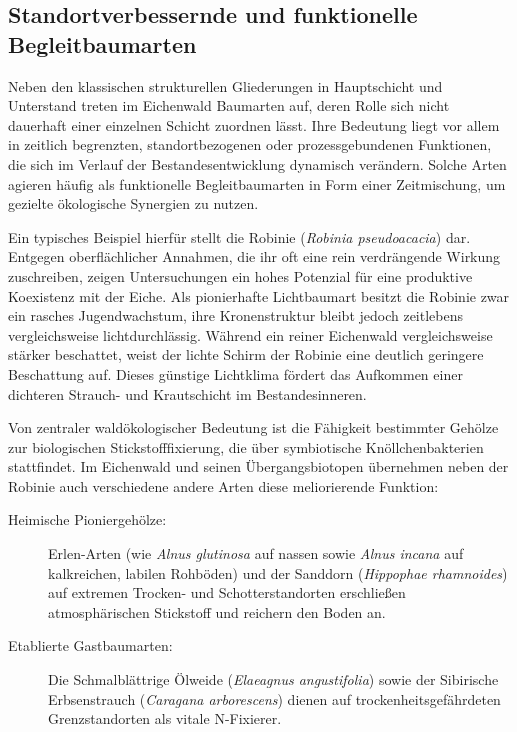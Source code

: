 \documentclass[twocolumn, bibliography=totoc, abstract=true]{scrartcl}
\begin{document}
\subsection{Standortverbessernde und funktionelle Begleitbaumarten}

Neben den klassischen strukturellen Gliederungen in Hauptschicht und Unterstand treten im Eichenwald Baumarten auf, deren Rolle sich nicht dauerhaft einer einzelnen Schicht zuordnen lässt. Ihre Bedeutung liegt vor allem in zeitlich begrenzten, standortbezogenen oder prozessgebundenen Funktionen, die sich im Verlauf der Bestandesentwicklung dynamisch verändern. Solche Arten agieren häufig als funktionelle Begleitbaumarten in Form einer Zeitmischung, um gezielte ökologische Synergien zu nutzen.

Ein typisches Beispiel hierfür stellt die Robinie (\textit{Robinia pseudoacacia}) dar. Entgegen oberflächlicher Annahmen, die ihr oft eine rein verdrängende Wirkung zuschreiben, zeigen Untersuchungen ein hohes Potenzial für eine produktive Koexistenz mit der Eiche. Als pionierhafte Lichtbaumart besitzt die Robinie zwar ein rasches Jugendwachstum, ihre Kronenstruktur bleibt jedoch zeitlebens vergleichsweise lichtdurchlässig. Während ein reiner Eichenwald vergleichsweise stärker beschattet, weist der lichte Schirm der Robinie eine deutlich geringere Beschattung auf. Dieses günstige Lichtklima fördert das Aufkommen einer dichteren Strauch- und Krautschicht im Bestandesinneren.

Von zentraler waldökologischer Bedeutung ist die Fähigkeit bestimmter Gehölze zur biologischen Stickstofffixierung, die über symbiotische Knöllchenbakterien stattfindet. Im Eichenwald und seinen Übergangsbiotopen übernehmen neben der Robinie auch verschiedene andere Arten diese meliorierende Funktion:

\begin{description}
\item[Heimische Pioniergehölze:] Erlen-Arten (wie \textit{Alnus glutinosa} auf nassen sowie \textit{Alnus incana} auf kalkreichen, labilen Rohböden) und der Sanddorn (\textit{Hippophae rhamnoides}) auf extremen Trocken- und Schotterstandorten erschließen atmosphärischen Stickstoff und reichern den Boden an. 
\item[Etablierte Gastbaumarten:] Die Schmalblättrige Ölweide (\textit{Elaeagnus angustifolia}) sowie der Sibirische Erbsenstrauch (\textit{Caragana arborescens}) dienen auf trockenheitsgefährdeten Grenzstandorten als vitale N-Fixierer. 
\end{description}
\end{document}
